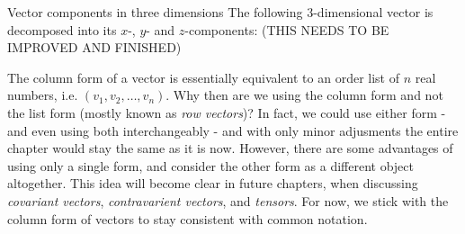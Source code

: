 \begin{example}{Vector components in three dimensions}{}
	The following $3$-dimensional vector is decomposed into its $x$-, $y$- and $z$-components:
	(THIS NEEDS TO BE IMPROVED AND FINISHED)

	\centering
\end{example}

The column form of a vector is essentially equivalent to an order list of $n$ real numbers, i.e. $(v_{1},v_{2},\dots,v_{n})$. Why then are we using the column form and not the list form (mostly known as \emph{row vectors})? In fact, we could use either form - and even using both interchangeably - and with only minor adjusments the entire chapter would stay the same as it is now. However, there are some advantages of using only a single form, and consider the other form as a different object altogether. This idea will become clear in future chapters, when discussing \emph{covariant vectors}, \emph{contravarient vectors}, and \emph{tensors}. For now, we stick with the column form of vectors to stay consistent with common notation.


